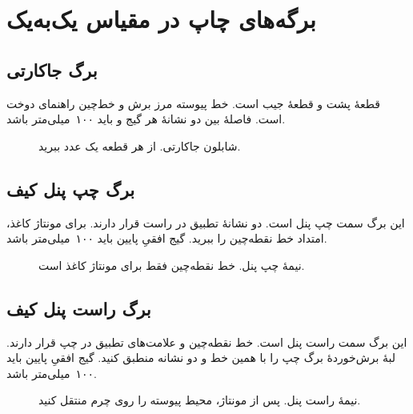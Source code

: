 \clearpage
\section{برگه‌های چاپ در مقیاس یک‌به‌یک}

\subsection{برگ جاکارتی}
\label{sheet:card}
قطعۀ  پشت و قطعۀ  جیب است. خط پیوسته مرز برش و خط‌چین راهنمای دوخت است. فاصلۀ بین دو نشانۀ هر گیج  و  باید ۱۰۰~میلی‌متر باشد.

\begin{figure}[!ht]
  \centering
  \CardPrintPattern
  \caption{شابلون جاکارتی. از هر قطعه یک عدد ببرید.}
  \label{fig:card-sheet}
\end{figure}

\clearpage
\subsection{برگ چپ پنل کیف}
\label{sheet:panel-left}
این برگ سمت چپ پنل است. دو نشانۀ تطبیق در راست قرار دارند. برای مونتاژ کاغذ، امتداد خط نقطه‌چین را ببرید. گیج افقیِ پایین باید ۱۰۰~میلی‌متر باشد.

\begin{figure}[!ht]
  \centering
  \PanelLeftTile
  \caption{نیمۀ چپ پنل. خط نقطه‌چین فقط برای مونتاژ کاغذ است.}
  \label{fig:panel-left}
\end{figure}

\clearpage
\subsection{برگ راست پنل کیف}
\label{sheet:panel-right}
این برگ سمت راست پنل است. خط نقطه‌چین و علامت‌های تطبیق در چپ قرار دارند. لبۀ برش‌خوردۀ برگ چپ را با همین خط و دو نشانه منطبق کنید. گیج افقیِ پایین باید ۱۰۰~میلی‌متر باشد.

\begin{figure}[!ht]
  \centering
  \PanelRightTile
  \caption{نیمۀ راست پنل. پس از مونتاژ، محیط پیوسته را روی چرم منتقل کنید.}
  \label{fig:panel-right}
\end{figure}
